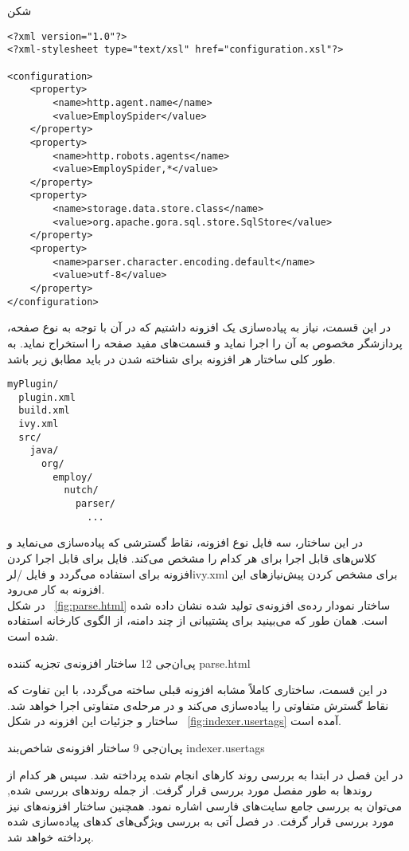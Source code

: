 ‌شکن

\begin{latin} 
\begin{lstlisting}[style=listXML]
<?xml version="1.0"?>
<?xml-stylesheet type="text/xsl" href="configuration.xsl"?>

<configuration>
	<property>
		<name>http.agent.name</name>
		<value>EmploySpider</value>
	</property>
	<property>
		<name>http.robots.agents</name>
		<value>EmploySpider,*</value>
	</property>
	<property>
		<name>storage.data.store.class</name>
		<value>org.apache.gora.sql.store.SqlStore</value>
	</property>
	<property>
		<name>parser.character.encoding.default</name>
		<value>utf-8</value>
	</property>
</configuration>
\end{lstlisting}
\end{latin}
در این قسمت، نیاز به پیاده‌سازی یک افزونه داشتیم که در آن با توجه به نوع صفحه، پردازشگر مخصوص به آن را اجرا نماید و قسمت‌های مفید صفحه را استخراج نماید. به طور کلی ساختار هر افزونه برای شناخته شدن در  باید مطابق زیر باشد.
\begin{latin}
\begin{verbatim}
myPlugin/
  plugin.xml
  build.xml
  ivy.xml
  src/
    java/
      org/
        employ/
          nutch/
            parser/
              ...
\end{verbatim}
\end{latin}

در این ساختار، سه فایل  نوع افزونه، نقاط گسترشی که پیاده‌سازی می‌نماید و کلاس‌های قابل اجرا برای هر کدام را مشخص می‌کند. فایل  برای قابل اجرا کردن افزونه برای  استفاده می‌گردد و فایل /لر{ivy.xml} برای مشخص کردن پیش‌نیازهای این افزونه به کار می‌رود. 
\\
در شکل ~\ref {fig:parse.html} ساختار نمودار رده‌ی افزونه‌ی تولید شده نشان داده شده است. همان طور که می‌بینید برای پشتیبانی از چند دامنه، از الگوی کارخانه استفاده شده است.

‌پی‌ان‌جی {12} {ساختار افزونه‌ی تجزیه کننده} {parse.html}

در این قسمت، ساختاری کاملاً مشابه افزونه قبلی ساخته می‌گردد، با این تفاوت که نقاط گسترش متفاوتی را پیاده‌سازی می‌کند و در مرحله‌ی متفاوتی اجرا خواهد شد. ساختار و جزئیات این افزونه در شکل ~\ref {fig:indexer.usertags} آمده است.

‌پی‌ان‌جی {9} {ساختار افزونه‌ی شاخص‌بند} {indexer.usertags}

در این فصل در ابتدا به بررسی روند کارهای انجام شده پرداخته شد. سپس هر کدام از روندها به طور مفصل مورد بررسی قرار گرفت. از جمله روندهای بررسی شده, می‌توان به بررسی جامع سایت‌های فارسی اشاره نمود. همچنین ساختار افزونه‌های  نیز مورد بررسی قرار گرفت. در فصل آتی به بررسی ویژگی‌های کدهای پیاده‌سازی شده پرداخته خواهد شد.
